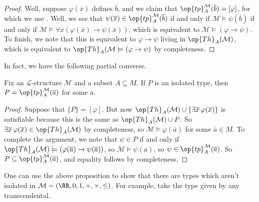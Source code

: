 \documentclass[../notes.tex]{subfiles}
\begin{document}
\begin{proof}
	Well, suppose $\varphi(\overline x)$ defines $\overline b$, and we claim that $\op{tp}_A^{\mathcal M}(\overline b)=[\varphi]$, for which we use . Well, we see that $\psi(\overline x)\in\op{tp}_A^{\mathcal M}(\overline b)$ if and only if $\mathcal M\models\psi(\overline b)$ if and only if $\mathcal M\models\forall\overline x(\varphi(\overline x)\to\psi(\overline x))$, which is equivalent to $\mathcal M\models(\varphi\to\psi)$. To finish, we note that this is equivalent to $\varphi\to\psi$ living in $\op{Th}_A(\mathcal M)$, which is equivalent to $\op{Th}_A(\mathcal M\models(\varphi\to\psi)$ by completeness.
\end{proof}
In fact, we have the following partial converse.
\begin{proposition}
	Fix an $\mathcal L$-structure $\mathcal M$ and a subset $A\subseteq M$. If $P$ is an isolated type, then $P=\op{tp}_A^{\mathcal M}(\overline a)$ for some $\overline a$.
\end{proposition}
\begin{proof}
	Suppose that $\{P\}=[\varphi]$. But now $\op{Th}_A(\mathcal M)\cup\{\exists\overline x\,\varphi(\overline x)\}$ is satisfiable because this is the same as $\op{Th}_A(\mathcal M)\cup P$. So $\exists\overline x\,\varphi(\overline x)\in\op{Th}_A(\mathcal M)$ by completeness, so $\mathcal M\models\varphi(\overline a)$ for some $\overline a\in M$. To complete the argument, we note that $\psi\in P$ if and only if $\op{Th}_A(\mathcal M)\models(\varphi(\overline a)\to\psi(\overline a))$, so $\mathcal M\models\psi(\overline a)$, so $\psi\in\op{tp}_A^{\mathcal M}(\overline a)$. So $P\subseteq\op{tp}_A^{\mathcal M}(\overline a)$, and equality follows by completeness.
\end{proof}
\begin{example}
	One can use the above proposition to show that there are types which aren't isolated in $\mathcal M=(\RR,0,1,+,\times,\le)$. For example, take the type given by any transcendental.
\end{example}
\end{document}
